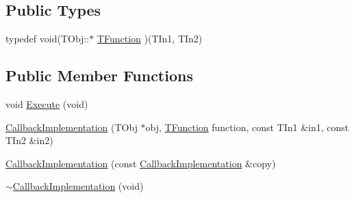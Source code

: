 \subsection*{Public Types}
\begin{DoxyCompactItemize}
\item 
typedef void(T\-Obj\-::$\ast$ \hyperlink{class_callback_implementation_3_01_t_obj_00_01_t_in1_00_01_t_in2_00_01_empty_class_00_01_empty_class_01_4_a972b47fde4d24656f515cb8f1b974376}{T\-Function} )(T\-In1, T\-In2)
\end{DoxyCompactItemize}
\subsection*{Public Member Functions}
\begin{DoxyCompactItemize}
\item 
void \hyperlink{class_callback_implementation_3_01_t_obj_00_01_t_in1_00_01_t_in2_00_01_empty_class_00_01_empty_class_01_4_acaacb27d9053ed610e33ba58e9163968}{Execute} (void)
\item 
\hyperlink{class_callback_implementation_3_01_t_obj_00_01_t_in1_00_01_t_in2_00_01_empty_class_00_01_empty_class_01_4_a474aca8009d5088fb2d939410a108aa3}{Callback\-Implementation} (T\-Obj $\ast$obj, \hyperlink{class_callback_implementation_3_01_t_obj_00_01_t_in1_00_01_t_in2_00_01_empty_class_00_01_empty_class_01_4_a972b47fde4d24656f515cb8f1b974376}{T\-Function} function, const T\-In1 \&in1, const T\-In2 \&in2)
\item 
\hyperlink{class_callback_implementation_3_01_t_obj_00_01_t_in1_00_01_t_in2_00_01_empty_class_00_01_empty_class_01_4_a6f5e6801be66234ef12acf65f64f7a75}{Callback\-Implementation} (const \hyperlink{class_callback_implementation}{Callback\-Implementation} \&copy)
\item 
\hyperlink{class_callback_implementation_3_01_t_obj_00_01_t_in1_00_01_t_in2_00_01_empty_class_00_01_empty_class_01_4_a4e9e6d1e967d71ae38d6dc3df6c62d3e}{$\sim$\-Callback\-Implementation} (void)
\end{DoxyCompactItemize}
